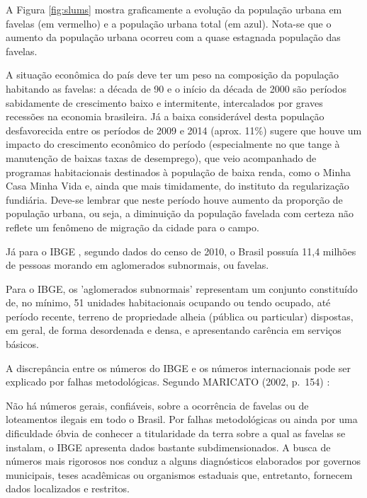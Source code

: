 \documentclass[
	12pt,				%
	oneside,			%
	a4paper,			%
	chapter=TITLE,		%
	section=TITLE,		%
	english,			%
	brazil				%
	]{abntex2}
\begin{document}
\begin{refsection}
A Figura \ref{fig:slums} mostra graficamente a evolução da população urbana em
favelas (em vermelho) e a população urbana total (em azul). Nota-se que o
aumento da população urbana ocorreu com a quase estagnada população das
favelas.

A situação econômica do país deve ter um peso na composição da população
habitando as favelas: a década de 90 e o início da década de 2000 são períodos
sabidamente de crescimento baixo e intermitente, intercalados por graves
recessões na economia brasileira. Já a baixa considerável desta população
desfavorecida entre os períodos de 2009 e 2014 (aprox. 11\%) sugere que houve um
impacto do crescimento econômico do período (especialmente no que tange à
manutenção de baixas taxas de desemprego), que veio acompanhado de programas
habitacionais destinados à população de baixa renda, como o Minha Casa Minha
Vida e, ainda que mais timidamente, do instituto da regularização fundiária.
Deve-se lembrar que neste período houve aumento da proporção de população
urbana, ou seja, a diminuição da população favelada com certeza não reflete um
fenômeno de migração da cidade para o campo.

Já para o IBGE \autocite{ibge}, segundo dados do censo de 2010, o Brasil possuía 11,4
milhões de pessoas morando em aglomerados subnormais, ou favelas.
\begin{citacao}
Para o IBGE, os 'aglomerados subnormais' representam um conjunto constituído de,
no mínimo, 51 unidades habitacionais ocupando ou tendo ocupado, até período
recente, terreno de propriedade alheia (pública ou particular) dispostas, em
geral, de forma desordenada e densa, e apresentando carência em serviços
básicos.
\cite{ibge2}
\end{citacao}
A discrepância entre os números do IBGE e os números internacionais pode ser
explicado por falhas metodológicas. Segundo MARICATO (2002, p.~154) \autocite[\emph{apud}][9]{silva}:
\begin{citacao}
Não há números gerais, confiáveis, sobre a ocorrência de favelas ou de
loteamentos ilegais em todo o Brasil. Por falhas metodológicas ou ainda por uma
dificuldade óbvia de conhecer a titularidade da terra sobre a qual as favelas se
instalam, o IBGE apresenta dados bastante subdimensionados. A busca de números
mais rigorosos nos conduz a alguns diagnósticos elaborados por governos
municipais, teses acadêmicas ou organismos estaduais que, entretanto, fornecem
dados localizados e restritos.
\end{citacao}
\begin{figure}[H]


\end{figure}
\end{refsection}
\end{document}
